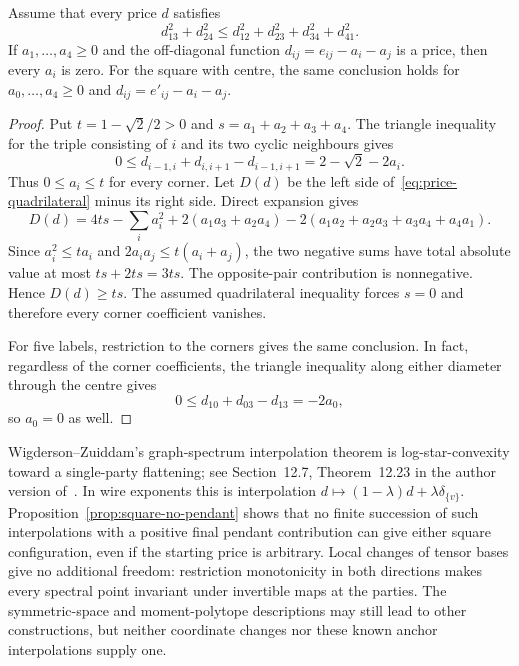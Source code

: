 \begin{proposition}
\label{prop:square-no-pendant}
Assume that every price $d$ satisfies
\begin{equation}
 d_{13}^2+d_{24}^2
 \leq d_{12}^2+d_{23}^2+d_{34}^2+d_{41}^2.
 \label{eq:price-quadrilateral}
\end{equation}
If $a_1,\ldots,a_4\geq0$ and the off-diagonal function
$d_{ij}=e_{ij}-a_i-a_j$ is a price, then every $a_i$ is zero.  For the square with centre, the same conclusion holds for $a_0,\ldots,a_4\geq0$ and $d_{ij}=e'_{ij}-a_i-a_j$.
\end{proposition}
\begin{proof}
Put $t=1-\sqrt2/2>0$ and $s=a_1+a_2+a_3+a_4$.  The triangle inequality for the triple consisting of $i$ and its two cyclic neighbours gives
\[
 0\leq d_{i-1,i}+d_{i,i+1}-d_{i-1,i+1}
       =2-\sqrt2-2a_i.
\]
Thus $0\leq a_i\leq t$ for every corner.  Let $D(d)$ be the left side of~\eqref{eq:price-quadrilateral} minus its right side.  Direct expansion gives
\[
 D(d)=4ts-\sum_i a_i^2
       +2(a_1a_3+a_2a_4)
       -2(a_1a_2+a_2a_3+a_3a_4+a_4a_1).
\]
Since $a_i^2\leq ta_i$ and $2a_ia_j\leq t(a_i+a_j)$, the two negative sums have total absolute value at most $ts+2ts=3ts$.  The opposite-pair contribution is nonnegative.  Hence $D(d)\geq ts$.  The assumed quadrilateral inequality forces $s=0$ and therefore every corner coefficient vanishes.

For five labels, restriction to the corners gives the same conclusion.  In fact, regardless of the corner coefficients, the triangle inequality along either diameter through the centre gives
\[
 0\leq d_{10}+d_{03}-d_{13}=-2a_0,
\]
so $a_0=0$ as well.
\end{proof}

Wigderson--Zuiddam's graph-spectrum interpolation theorem is log-star-convexity toward a single-party flattening; see Section~12.7, Theorem~12.23 in the author version of~\cite{wz-spectra}.  In wire exponents this is interpolation $d\mapsto(1-\lambda)d+\lambda\delta_{\{v\}}$.  Proposition~\ref{prop:square-no-pendant} shows that no finite succession of such interpolations with a positive final pendant contribution can give either square configuration, even if the starting price is arbitrary.  Local changes of tensor bases give no additional freedom: restriction monotonicity in both directions makes every spectral point invariant under invertible maps at the parties.  The symmetric-space and moment-polytope descriptions may still lead to other constructions, but neither coordinate changes nor these known anchor interpolations supply one.

